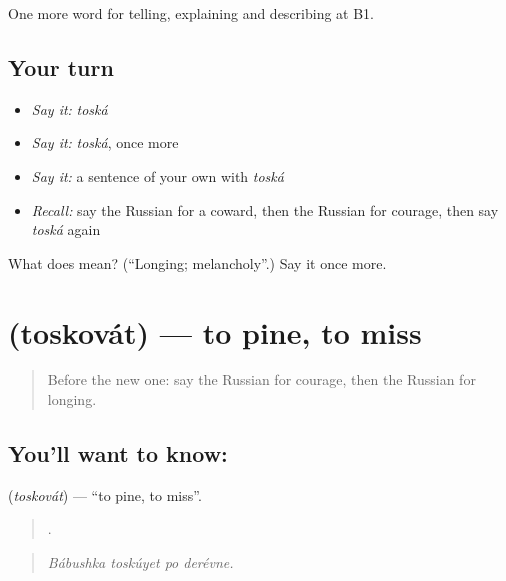 \begin{grammarlens}[title={What you've built}]
One more word for telling, explaining and describing at B1.
\end{grammarlens}

\subsection*{Your turn}
\begin{itemize}
\raggedright
  \item \emph{Say it:} \emph{toská}
  \item \emph{Say it:} \emph{toská}, once more
  \item \emph{Say it:} a sentence of your own with \emph{toská}
  \item \emph{Recall:} say the Russian for a coward, then the Russian for courage, then say \emph{toská} again
\end{itemize}

\begin{tcolorbox}[breakable,colback=teal!4,colframe=teal!35!black,title={Before you move on}]
What does  mean? (\textquotedblleft{}Longing; melancholy\textquotedblright{}.) Say it once more.
\end{tcolorbox}
\section[\texorpdfstring{\ru{тосковать} (toskovát)}{тосковать (toskovát)}]{ (toskovát) — to pine, to miss}

\label{lesson:RU-C477-toskovat}



\begin{quote}
Before the new one: say the Russian for courage, then the Russian for longing.
\end{quote}

\subsection*{You'll want to know: }
\textbf{} (\emph{toskovát}) — \textquotedblleft{}to pine, to miss\textquotedblright{}.

\begin{quote}
   .
\end{quote}

\begin{quote}
\emph{Bábushka toskúyet po derévne.}
\end{quote}

